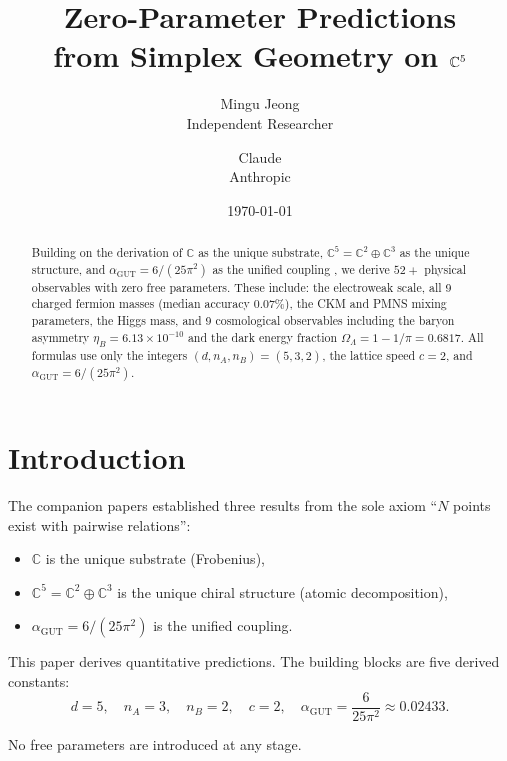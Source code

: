 \documentclass[12pt]{article}
\title{Zero-Parameter Predictions\\
  from Simplex Geometry on $\CC^5$}
\author{Mingu Jeong\\Independent Researcher
\and Claude\\Anthropic}
\date{\today}
\theoremstyle{definition}
\theoremstyle{remark}
\newcommand{\CC}{\mathbb{C}}
\newcommand{\agut}{\alpha_{\mathrm{GUT}}}
\begin{document}
\maketitle

\begin{abstract}
Building on the derivation of
$\CC$ as the unique substrate,
$\CC^5 = \CC^2 \oplus \CC^3$ as the
unique structure, and
$\agut = 6/(25\pi^2)$ as the unified coupling
\cite{Paper1, Paper2},
we derive $52+$ physical observables
with zero free parameters.
These include: the electroweak scale,
all 9 charged fermion masses
(median accuracy $0.07\%$),
the CKM and PMNS mixing parameters,
the Higgs mass,
and 9 cosmological observables
including the baryon asymmetry
$\eta_B = 6.13 \times 10^{-10}$
and the dark energy fraction
$\Omega_\Lambda = 1 - 1/\pi = 0.6817$.
All formulas use only the integers
$(d, n_A, n_B) = (5, 3, 2)$,
the lattice speed $c = 2$,
and $\agut = 6/(25\pi^2)$.
\end{abstract}

\tableofcontents
\newpage

\section{Introduction}

The companion papers \cite{Paper1, Paper2}
established three results from the sole axiom
``$N$ points exist with pairwise relations'':

\begin{itemize}
\item $\CC$ is the unique substrate (Frobenius),
\item $\CC^5 = \CC^2 \oplus \CC^3$ is the unique
  chiral structure (atomic decomposition),
\item $\agut = 6/(25\pi^2)$ is the unified coupling.
\end{itemize}

This paper derives quantitative predictions.
The building blocks are five derived constants:
\begin{equation}
d = 5, \quad n_A = 3, \quad n_B = 2, \quad
c = 2, \quad
\agut = \frac{6}{25\pi^2} \approx 0.02433.
\end{equation}

No free parameters are introduced at any stage.

\end{document}
